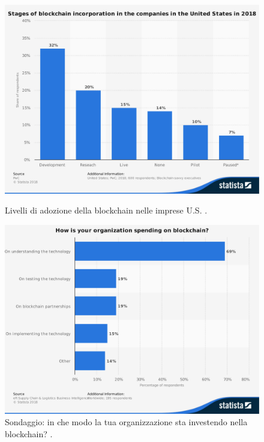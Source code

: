 \begin{figure}[H]
	\begin{minipage}{0.48\textwidth}
		\centering
		\includegraphics[width=1\linewidth]{images/chap_intro/stages-of-blockchain-incorporation.pdf}
		\caption{Livelli di adozione della blockchain nelle imprese U.S.
			\cite{stages-of-blockchain-incorporation}.}
		\label{fig:stages-of-blockchain-incorporation}
	\end{minipage}
	\begin{minipage}{0.48\textwidth}
		\centering
		\includegraphics[width=1\linewidth]{images/chap_intro/top-spending-in-supply-chain-industry.pdf}
		\caption{Sondaggio: in che modo la tua organizzazione sta investendo nella blockchain?
			\cite{top-spending-in-supply-chain-industry}.}
		\label{fig:top-spending-in-supply-chain-industry}
	\end{minipage}\hfill
\end{figure}

